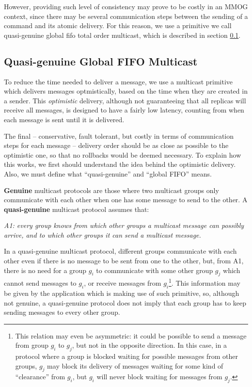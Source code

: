 \documentclass[times, 10pt]{article}
\begin{document}
However, providing such level of consistency may prove to be costly in an MMOG context, since there may be several communication steps between the sending of a command and its atomic delivery. For this reason, we use a primitive we call quasi-genuine global fifo total order multicast, which is described in section \ref{sec:quasi}.

\subsection{Quasi-genuine Global FIFO Multicast}
\label{sec:quasi}

To reduce the time needed to deliver a message, we use a multicast primitive which delivers messages optmistically, based on the time when they are created in a sender. This \emph{optimistic} delivery, although not guaranteeing that all replicas will receive all messages, is designed to have a fairly low latency, counting from when each message is sent until it is delivered.

The final -- conservative, fault tolerant, but costly in terms of communication steps for each message -- delivery order should be as close as possible to the optimistic one, so that no rollbacks would be deemed necessary. To explain how this works, we first should understand the idea behind the optimistic delivery. Also, we must define what ``quasi-genuine'' and ``global FIFO'' means.

\textbf{Genuine} multicast protocols are those where two multicast groups only communicate with each other when one has some message to send to the other. A \textbf{quasi-genuine} multicast protocol assumes that: 

\begin{center}
\emph{A1: every group knows from which other groups a multicast message can possibly arrive, and to which other groups it can send a multicast message.}
\end{center}

In a quasi-genuine multicast protocol, different groups communicate with each other even if there is no message to be sent from one to the other, but, from A1, there is no need for a group $g_i$ to communicate with some other group $g_j$ which cannot send messages to $g_i$, or receive messages from $g_i$\footnote{This relation may even be asymmetric: it could be possible to send a message from group $g_i$ to $g_j$, but not in the opposite direction. In this case, in a protocol where a group is blocked waiting for possible messages from other groups, $g_j$ may block its delivery of messages waiting for some kind of ``clearance'' from $g_i$, but $g_i$ will never block waiting for messages from $g_j$.}. This information may be given by the application which is making use of such primitive, so, although not genuine, a quasi-genuine protocol does not imply that each group has to keep sending messages to every other group.
\end{document}
